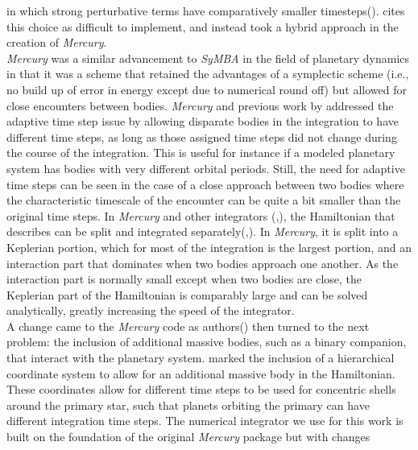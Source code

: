\documentclass[manuscript]{aastex631}
\begin{document}
in which strong perturbative terms have comparatively smaller timesteps(\cite{dun98}). \cite{cha99} cites this choice as difficult to implement, and instead 
took a hybrid approach in the creation of \textit{Mercury}. \\
 \textit{Mercury} was a similar advancement to \textit{SyMBA} in the field of planetary dynamics in that it was a \cite{wis91} scheme that retained the advantages of a symplectic scheme 
(i.e., no build up of error in energy except due to numerical round off) but allowed for close encounters between bodies. \textit{Mercury} and previous work by \cite{sah94}
addressed the adaptive time step issue by allowing disparate bodies in the integration to have different time steps, as long as those assigned time steps 
did not change during the course of the integration. This is useful for instance if a modeled planetary system
has bodies with very different orbital periods.
Still, the need for adaptive time steps can be seen in the case of a close approach between
two bodies where the characteristic timescale of the encounter can be quite a bit smaller than the original time steps. 
In \textit{Mercury} and other integrators (\cite{dun98},\cite{ric00}), the Hamiltonian that describes
can be split and integrated separately(\cite{yos90},\cite{sah92}). In \textit{Mercury}, it is split into a Keplerian portion, which for most of the 
integration is the largest portion, and an interaction part that dominates when two bodies 
approach one another. As the interaction part is normally small except when two bodies are close, the Keplerian part of the Hamiltonian is comparably large and can be solved
analytically, greatly increasing the speed of the integrator. \\
\indent A change came to the \textit{Mercury} code as authors(\cite{cha02}) then turned to the next problem: the inclusion of additional massive bodies, such as a 
binary companion, that interact with the planetary system. \cite{cha02} marked the inclusion of a hierarchical coordinate system
to allow for an additional massive body in the Hamiltonian. These coordinates allow for different time steps to be used for concentric shells around the primary star,
such that planets orbiting the primary can have different integration time steps.
The numerical integrator we use for this work is built on the foundation of the original \textit{Mercury} package but with changes
\end{document}
